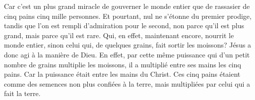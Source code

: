 Car c’est un plus grand miracle de gouverner le monde entier
	que de rassasier de cinq pains cinq mille personnes.
Et pourtant, nul ne s’étonne du premier prodige,
	tandis que l’on est rempli d’admiration pour le second,
	non parce qu’il est plus grand, mais parce qu’il est rare.
Qui, en effet, maintenant encore, nourrit le monde entier,
	sinon celui qui, de quelques grains, fait sortir les moissons?
	Jésus a donc agi à la manière de Dieu.
En effet, par cette même puissance
		qui d’un petit nombre de grains multiplie les moissons,
	il a multiplié entre ses mains les cinq pains.
Car la puissance était entre les mains du Christ.
	Ces cinq pains étaient comme des semences non plus confiées à la terre,
	mais multipliées par celui qui a fait la terre.
